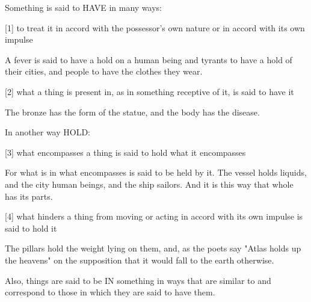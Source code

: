 Something is said to HAVE in many ways:

[1]     to treat it in accord with the possessor's own nature or
        in accord with its own impulse

        A fever is said to have a hold on a human being and 
        tyrants to have a hold of their cities, and
        people to have the clothes they wear.

[2]     what a thing is present in, as in something receptive of it,
        is said to have it

        The bronze has the form of the statue, and
        the body has the disease.

In another way HOLD:

[3]     what encompasses a thing is said to hold what it encompasses

        For what is in what encompasses is said to be held by it.
        The vessel holds liquids, and the city human beings, and the ship sailors.
        And it is this way that whole has its parts.

[4]     what hinders a thing from moving or acting in accord with its own impulse
        is said to hold it

        The pillars hold the weight lying on them, and,
        as the poets say "Atlas holds up the heavens" on the supposition
        that it would fall to the earth otherwise.

Also, things are said to be IN something in ways that are similar to and
correspond to those in which they are said to have them.
